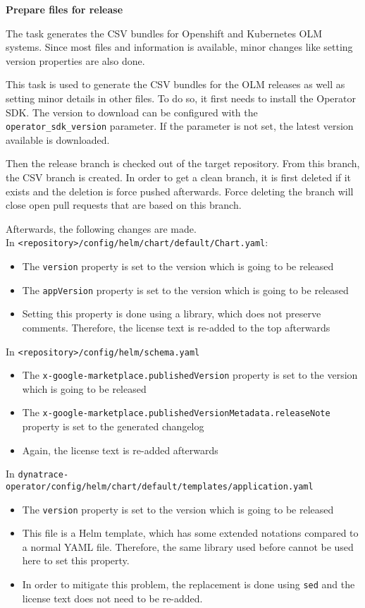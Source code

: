 \textbf{Prepare files for release}

The task generates the CSV bundles for Openshift and Kubernetes OLM systems.
Since most files and information is available, minor changes like setting version properties are also done.

This task is used to generate the CSV bundles for the OLM releases as well as setting minor details in other files.
To do so, it first needs to install the Operator SDK.
The version to download can be configured with the \verb|operator_sdk_version| parameter.
If the parameter is not set, the latest version available is downloaded.

\pagebreak

Then the release branch is checked out of the target repository.
From this branch, the CSV branch is created.
In order to get a clean branch, it is first deleted if it exists and the deletion is force pushed afterwards.
Force deleting the branch will close open pull requests that are based on this branch.

Afterwards, the following changes are made. \\
In \verb|<repository>/config/helm/chart/default/Chart.yaml|:
\begin{itemize}
    \item The \verb|version| property is set to the version which is going to be released
    \item The \verb|appVersion| property is set to the version which is going to be released
    \item Setting this property is done using a library, which does not preserve comments.
    Therefore, the license text is re-added to the top afterwards
\end{itemize}

In \verb|<repository>/config/helm/schema.yaml|
\begin{itemize}
    \item The \verb|x-google-marketplace.publishedVersion| property is set to the version which is going to be released
    \item The \verb|x-google-marketplace.publishedVersionMetadata.releaseNote| property is set to the generated changelog
    \item Again, the license text is re-added afterwards
\end{itemize}

In \verb|dynatrace-operator/config/helm/chart/default/templates/application.yaml|
\begin{itemize}
    \item The \verb|version| property is set to the version which is going to be released
    \item This file is a Helm template, which has some extended notations compared to a normal YAML file.
        Therefore, the same library used before cannot be used here to set this property.
    \item In order to mitigate this problem, the replacement is done using \verb|sed| and the license text does not need to be re-added.
\end{itemize}


